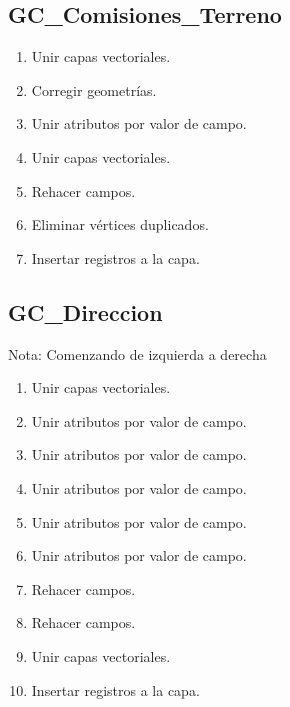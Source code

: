 \documentclass[letterpaper,10pt,spanish]{sphinxmanual}
\begin{document}
\subsection{GC\_Comisiones\_Terreno}
\label{\detokenize{ETL_Cobol/Model:gc-comisiones-terreno}}\begin{enumerate}
%
\item {} 
Unir capas vectoriales.

\item {} 
Corregir geometrías.

\item {} 
Unir atributos por valor de campo.

\item {} 
Unir capas vectoriales.

\item {} 
Rehacer campos.

\item {} 
Eliminar vértices duplicados.

\item {} 
Insertar registros a la capa.


\end{enumerate}


\subsection{GC\_Direccion}
\label{\detokenize{ETL_Cobol/Model:gc-direccion}}
Nota: Comenzando de izquierda a derecha
\begin{enumerate}
%
\item {} 
Unir capas vectoriales.

\item {} 
Unir atributos por valor de campo.

\item {} 
Unir atributos por valor de campo.

\item {} 
Unir atributos por valor de campo.

\item {} 
Unir atributos por valor de campo.

\item {} 
Unir atributos por valor de campo.

\item {} 
Rehacer campos.

\item {} 
Rehacer campos.

\item {} 
Unir capas vectoriales.

\item {} 
Insertar registros a la capa.


\end{enumerate}
\end{document}
